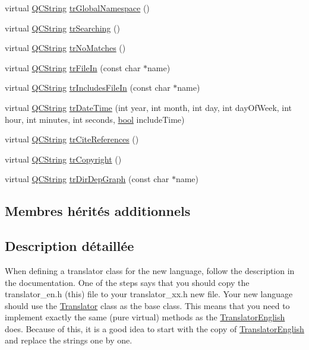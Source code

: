 \begin{DoxyCompactItemize}
\item 
virtual \hyperlink{class_q_c_string}{Q\+C\+String} \hyperlink{class_translator_catalan_aba4ea5c0dff73774f25cb24a416e4bda}{tr\+Global\+Namespace} ()
\item 
virtual \hyperlink{class_q_c_string}{Q\+C\+String} \hyperlink{class_translator_catalan_af9bdc6ff9219376084ef32175daf99ae}{tr\+Searching} ()
\item 
virtual \hyperlink{class_q_c_string}{Q\+C\+String} \hyperlink{class_translator_catalan_ab50afd95cd8aa1bf1ebaadf11a5b26c7}{tr\+No\+Matches} ()
\item 
virtual \hyperlink{class_q_c_string}{Q\+C\+String} \hyperlink{class_translator_catalan_a74a36a31dcdc2bf207d97b5ea314c739}{tr\+File\+In} (const char $\ast$name)
\item 
virtual \hyperlink{class_q_c_string}{Q\+C\+String} \hyperlink{class_translator_catalan_a8325005bd0f609f86413e9263151d871}{tr\+Includes\+File\+In} (const char $\ast$name)
\item 
virtual \hyperlink{class_q_c_string}{Q\+C\+String} \hyperlink{class_translator_catalan_af79c64f486cb2a02a213b33e63a2cc66}{tr\+Date\+Time} (int year, int month, int day, int day\+Of\+Week, int hour, int minutes, int seconds, \hyperlink{qglobal_8h_a1062901a7428fdd9c7f180f5e01ea056}{bool} include\+Time)
\item 
virtual \hyperlink{class_q_c_string}{Q\+C\+String} \hyperlink{class_translator_catalan_ad9653ad20d3a6568eae019b0029501cc}{tr\+Cite\+References} ()
\item 
virtual \hyperlink{class_q_c_string}{Q\+C\+String} \hyperlink{class_translator_catalan_a792d3d011ea78e8bcf0fd9729ef5ea58}{tr\+Copyright} ()
\item 
virtual \hyperlink{class_q_c_string}{Q\+C\+String} \hyperlink{class_translator_catalan_af31acbb2bd1658f9fdfe832be789c703}{tr\+Dir\+Dep\+Graph} (const char $\ast$name)
\end{DoxyCompactItemize}
\subsection*{Membres hérités additionnels}


\subsection{Description détaillée}
When defining a translator class for the new language, follow the description in the documentation. One of the steps says that you should copy the translator\+\_\+en.\+h (this) file to your translator\+\_\+xx.\+h new file. Your new language should use the \hyperlink{class_translator}{Translator} class as the base class. This means that you need to implement exactly the same (pure virtual) methods as the \hyperlink{class_translator_english}{Translator\+English} does. Because of this, it is a good idea to start with the copy of \hyperlink{class_translator_english}{Translator\+English} and replace the strings one by one.

